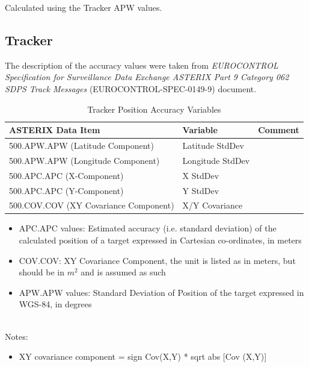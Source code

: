 Calculated using the Tracker APW values.

\subsection{Tracker}

The description of the accuracy values were taken from \textit{EUROCONTROL Specification for Surveillance Data Exchange ASTERIX Part 9 Category 062 SDPS Track Messages} (EUROCONTROL-SPEC-0149-9) document.

\begin{center}
 \begin{table}[H]
  \begin{tabularx}{\textwidth}{ | X | l | l | }
    \hline
    \textbf{ASTERIX Data Item} & \textbf{Variable} & \textbf{Comment} \\ \hline
     500.APW.APW (Latitude Component) & Latitude StdDev &  \\ \hline
     500.APW.APW (Longitude Component) & Longitude StdDev  &  \\ \hline
     500.APC.APC (X-Component) & X StdDev &  \\ \hline
     500.APC.APC (Y-Component) & Y StdDev  &  \\ \hline
     500.COV.COV (XY Covariance Component) & X/Y Covariance  &  \\ \hline
\end{tabularx}
  \caption{Tracker Position Accuracy Variables}
\end{table}
\end{center}

\begin{itemize}
\item APC.APC values: Estimated accuracy (i.e. standard deviation) of the calculated position of a target expressed in Cartesian co-ordinates, in meters
\item COV.COV: XY Covariance Component, the unit is listed as in meters, but should be in $m^2$ and is assumed as such
\item APW.APW values: Standard Deviation of Position of the target expressed in WGS-84, in degrees
\end{itemize}
\ \\

Notes:
\begin{itemize}
\item XY covariance component = sign {Cov(X,Y)} * sqrt {abs [Cov (X,Y)]}
\end{itemize}
